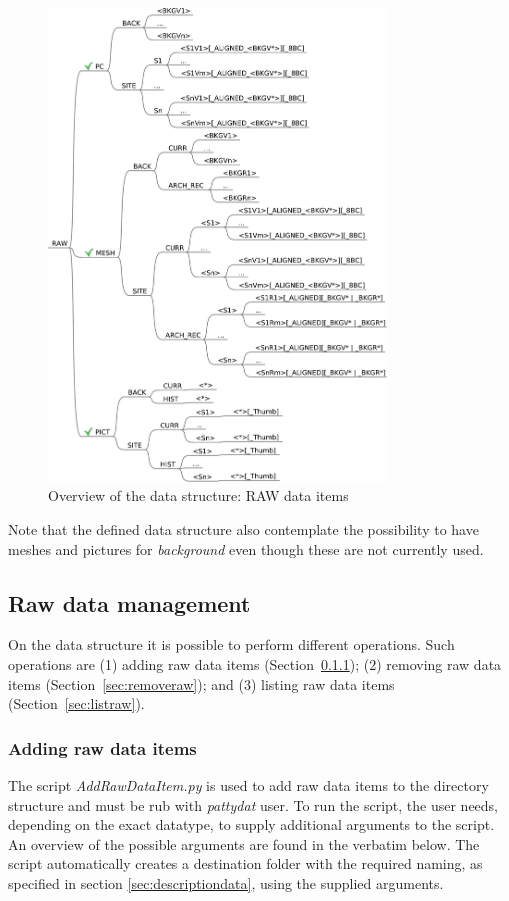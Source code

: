 \begin{figure}[] \centering
\includegraphics[width=0.8\textwidth]{fig/data_structure/directory_structure_raw}
\caption{Overview of the data structure: RAW data items}
\label{fig:directory_structure_overview_raw} \end{figure}

Note that the defined data structure also contemplate the possibility to have meshes and pictures for \textit{background} even though these are not currently used.

\subsection{Raw data management}
On the data structure it is possible to perform different operations. Such operations
are (1) adding raw data items (Section~\ref{sec:addraw}); (2) removing raw data
items (Section~\ref{sec:removeraw}); and (3) listing raw data items (Section~\ref{sec:listraw}).

\subsubsection{Adding raw data items}
\label{sec:addraw} 
The script \textit{AddRawDataItem.py} is used to add raw data items to the directory
structure and must be rub with \textit{pattydat} user. To run the script, the user needs, depending on the exact datatype,
to supply additional arguments to the script. An overview of the possible arguments
are found in the verbatim below. The script automatically creates a destination
folder with the required naming, as specified in section \ref{sec:descriptiondata},
using the supplied arguments.

